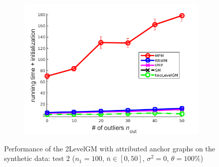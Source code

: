 \begin{figure}
\begin{subfigure}[b]{0.3\textwidth}
		\includegraphics[scale=0.25]{"chapter3/fig/SyntheticTest/descr/Results_v4.3.3/Test3/time_summary_avg10t"} 
	\end{subfigure} 	
	\caption[Performance of the 2LevelGM with attributed anchor graphs on the synthetic data (test $2$)]{Performance of the 2LevelGM with attributed anchor graphs on the synthetic data: test $2$ ($n_1=100$, $\bar{n}\in[0,50]$, $\sigma^2=0$, $\theta=100\%$)}
	\label{fig:synTest2_descr_ver433}
\end{figure}
